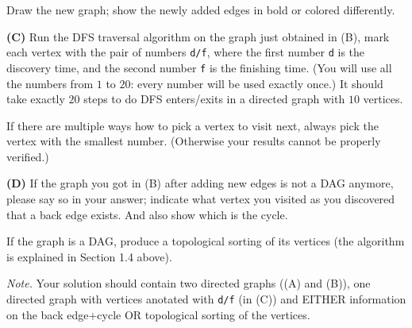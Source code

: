 \documentclass[a4paper,12pt]{article}
\begin{document}
Draw the new graph; show the newly added edges in bold or colored differently.

\vspace{10pt}
{\bf (C)} Run the DFS traversal algorithm on the graph just obtained in (B), mark each vertex 
with the pair of numbers {\tt d/f}, where the first number {\tt d} is the 
discovery time, and the second number {\tt f} is the finishing time. 
(You will use all the numbers from $1$ to $20$: every number will be used
exactly once.) It should take exactly $20$ steps to do DFS enters/exits in 
a directed graph with $10$ vertices.

If there are multiple ways how to pick a vertex to visit next, always
pick the vertex with the smallest number. (Otherwise your results cannot be
properly verified.)

\vspace{10pt}
{\bf (D)} If the graph you got in (B) after adding new edges is not a DAG anymore, 
please say so in your answer; indicate what vertex you visited as you discovered 
that a back edge exists. And also show which is the cycle.

If the graph is a DAG, produce a topological sorting of its vertices
(the algorithm is explained in Section 1.4 above). 

\vspace{10pt}
{\em Note.} Your solution should contain two directed graphs ((A) and (B)), one
directed graph with vertices anotated with {\tt d/f} (in (C)) and 
EITHER information on the back edge+cycle OR topological sorting of the vertices.
\end{document}
